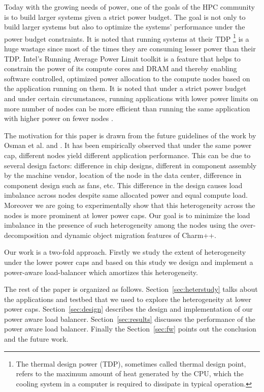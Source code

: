 Today with the growing needs of power, one of the goals of the HPC community is
to build larger systems given a strict power budget. The goal is not only to
build larger systems but also to optimize the systems' performance under the
power budget constraints. It is noted that running systems at their TDP
\footnote{ The thermal design power (TDP), sometimes called thermal design
  point, refers to the maximum amount of heat generated by the CPU, which the
    cooling system in a computer is required to dissipate in typical
    operation.} is a huge wastage since most of the times they are consuming
    lesser power than their TDP. Intel's Running Average Power Limit\cite{rapl}
    toolkit is a feature that helps to constrain the power of its compute cores
    and DRAM and thereby enabling software controlled, optimized power
    allocation to the compute nodes based on the application running on them.
    It is noted that under a strict power budget and under certain
    circumstances, running applications with lower power limits on more number
    of nodes can be more efficient than running the same application with higher
    power on fewer nodes \cite{powerCluster2013}.


The motivation for this paper is drawn from the future guidelines of the work
by Osman et al.\cite{powerCluster2013} and \cite{osmanthesis}.  It has been
empirically observed that under the same power cap, different nodes yield
different application performance. This can be due to several design factors:
difference in chip designs, different in component assembly by the machine
vendor, location of the node in the data center, difference in component design
such as fans, etc. This difference in the design causes load imbalance across
nodes despite same allocated power and equal compute load. Moreover we are
going to experimentally show that this heterogeneity across the nodes is more
prominent at lower power caps.  Our goal is to minimize the load imbalance in
the presence of such heterogeneity among the nodes using the over-decomposition
and dynamic object migration features of Charm++\cite{ChareKernelICPP90}.

Our work is a two-fold approach. Firstly we study the extent of heterogeneity
under the lower power caps and based on this study we design and implement a
power-aware load-balancer which amortizes this heterogeneity.

The rest of the paper is organized as follows. Section~\ref{sec:heterstudy}
talks about the applications and testbed that we used to explore the
heterogeneity at lower power caps. 
  Section~\ref{sec:design} describes the design and implementation of our power
  aware load balancer.  Section~\ref{sec:results} discusses the performance of
  the power aware load balancer. Finally the Section~\ref{sec:fw} points out
  the conclusion and the future work.
